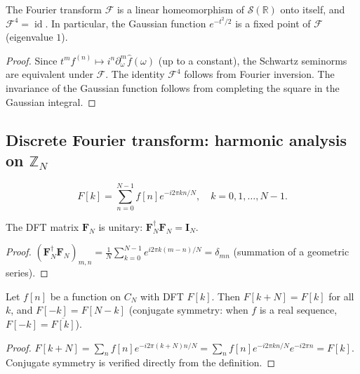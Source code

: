 \begin{property}\label{prop:schwartz_invariance}
The Fourier transform $\mathcal{F}$ is a linear homeomorphism of $\mathcal{S}(\mathbb{R})$ onto itself, and $\mathcal{F}^4=\operatorname{id}$. In particular, the Gaussian function $e^{-t^2/2}$ is a fixed point of $\mathcal{F}$ (eigenvalue $1$).
\end{property}

\begin{proof}
Since $t^m f^{(n)}\mapsto i^n\partial_\omega^m\hat f(\omega)$ (up to a constant), the Schwartz seminorms are equivalent under $\mathcal{F}$. The identity $\mathcal{F}^4$ follows from Fourier inversion. The invariance of the Gaussian function follows from completing the square in the Gaussian integral.
\end{proof}

\subsection{\texorpdfstring{Discrete Fourier transform: harmonic analysis on $\mathbb{Z}_N$}{Discrete Fourier transform}}

\begin{definition}[DFT]\label{def:dft}
\[F[k] = \sum_{n=0}^{N-1} f[n] e^{-i 2\pi kn / N}, \quad k = 0,1,\dots,N-1.\]
\end{definition}

\begin{proposition}\label{prop:dft_unitary}
The DFT matrix $\mathbf{F}_N$ is unitary: $\mathbf{F}_N^\dagger \mathbf{F}_N = \mathbf{I}_N$.
\end{proposition}

\begin{proof}
$(\mathbf{F}_N^\dagger \mathbf{F}_N)_{m,n} = \frac{1}{N}\sum_{k=0}^{N-1} e^{i2\pi k(m-n)/N} = \delta_{mn}$ (summation of a geometric series).
\end{proof}

\begin{lemma}\label{lem:dft_periodicity}
Let $f[n]$ be a function on $C_N$ with DFT $F[k]$. Then $F[k+N] = F[k]$ for all $k$, and $F[-k] = F[N-k]$ (conjugate symmetry: when $f$ is a real sequence, $F[-k] = \overline{F[k]}$).
\end{lemma}

\begin{proof}
$F[k+N] = \sum_n f[n] e^{-i2\pi(k+N)n/N} = \sum_n f[n] e^{-i2\pi kn/N} e^{-i2\pi n} = F[k]$. Conjugate symmetry is verified directly from the definition.
\end{proof}

